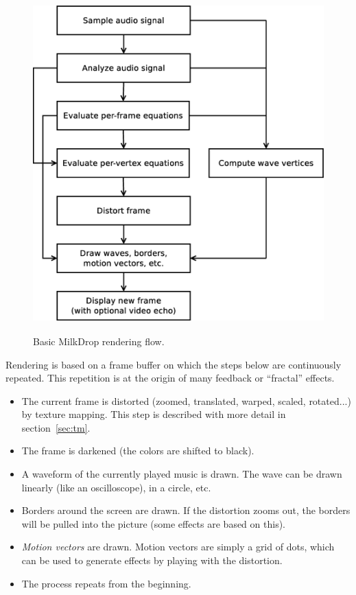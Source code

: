 \documentclass[a4paper,11pt]{kthesis}
\begin{document}
\begin{figure}[htp]
\centering
\includegraphics[height=130mm]{renderflow.eps}
\caption{Basic MilkDrop rendering flow.}
\label{fig:renderflow}
\end{figure}

Rendering is based on a frame buffer on which the steps below are continuously repeated. This repetition is at the origin of many feedback or ``fractal'' effects.
\begin{itemize}
\item The current frame is distorted (zoomed, translated, warped, scaled, rotated...) by texture mapping. This step is described with more detail in section~\ref{sec:tm}.
\item The frame is darkened (the colors are shifted to black).
\item A waveform of the currently played music is drawn. The wave can be drawn linearly (like an oscilloscope), in a circle, etc.
\item Borders around the screen are drawn. If the distortion zooms out, the borders will be pulled into the picture (some effects are based on this).
\item \textit{Motion vectors} are drawn. Motion vectors are simply a grid of dots, which can be used to generate effects by playing with the distortion.
\item The process repeats from the beginning.
\end{itemize}
\end{document}
